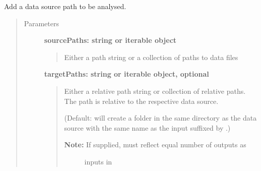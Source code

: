 \documentclass[letterpaper,10pt,english]{sphinxmanual}
\begin{document}
\begin{fulllineitems}

\begin{fulllineitems}
\label{fseq.reading:fseq.reading.seq_reader.SeqReader.DATA_INITIAL_SIZE}
\end{fulllineitems}


\begin{fulllineitems}
\label{fseq.reading:fseq.reading.seq_reader.SeqReader.DEBUG}
\end{fulllineitems}


\begin{fulllineitems}
\label{fseq.reading:fseq.reading.seq_reader.SeqReader.WORKERS}
\end{fulllineitems}


\begin{fulllineitems}
\label{fseq.reading:fseq.reading.seq_reader.SeqReader.addData}
Add a data source path to be analysed.
\begin{quote}\begin{description}
\item[{Parameters}] \leavevmode
\textbf{sourcePaths: string or iterable object}
\begin{quote}

Either a path string or a collection of paths to data files
\end{quote}

\textbf{targetPaths: string or iterable object, optional}
\begin{quote}

Either a relative path string or collection of relative paths.
The path is relative to the respective data source.

(Default: will create a folder in the same directory as the 
data source with the same name as the input suffixed by
.)
\begin{description}
\item[{\textbf{Note:} If supplied, must reflect equal number of outputs as}] \leavevmode
inputs in 


\end{description}
\end{quote}
\end{description}
\end{quote}
\end{fulllineitems}
\end{fulllineitems}
\end{document}
